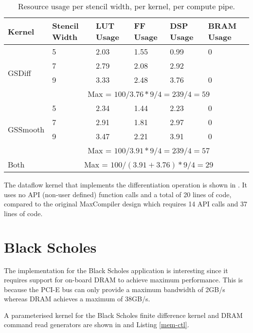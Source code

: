 \begin{table}[ht!]
  \begin{tabularx}{\textwidth}{X|X|X|X|X|X}
    Kernel                    & Stencil Width & LUT Usage & FF Usage & DSP Usage & BRAM Usage   \\
    \hline\hline
    \multirow{4}{*}{GSDiff}   & 5             & 2.03      & 1.55     & 0.99      & 0            \\
    & 7             & 2.79      & 2.08     & 2.92      &              \\
    & 9             & 3.33      & 2.48     & 3.76      & 0            \\
    \cline{2-6}
    & \multicolumn{5}{c}{Max = $100 / 3.76 * 9 / 4 = 239 / 4 = 59 $} \\
    \hline
    \multirow{4}{*}{GSSmooth} & 5             & 2.34      & 1.44     & 2.23      & 0            \\
    & 7             & 2.91      & 1.81     & 2.97      & 0            \\
    & 9             & 3.47      & 2.21     & 3.91      & 0            \\
    \cline{2-6}
    & \multicolumn{5}{c}{Max = $100 / 3.91 * 9 / 4 = 239 / 4 = 57 $} \\
    \hline
    Both                       & \multicolumn{5}{c}{Max = $100 / (3.91 + 3.76) * 9 / 4 = 29 $}  \\
  \end{tabularx}
  \caption{Resource usage per stencil width, per kernel, per compute pipe.}
  \label{table:nd2}
\end{table}


The \FAST{} dataflow kernel that implements the differentiation
operation is shown in . It uses no API (non-user
defined) function calls and a total of 20 lines of code, compared to
the original MaxCompiler design which requires 14 API calls and 37
lines of code.

 \section{Black Scholes}

 The implementation for the Black Scholes application is interesting
 since it requires support for on-board DRAM to achieve maximum
 performance. This is because the PCI-E bus can only provide a maximum
 bandwidth of 2GB/s whereas DRAM achieves a maximum of 38GB/s.

 A parameterised \FAST{} kernel for the Black Scholes finite
 difference kernel and DRAM command read generators are shown in
  and Listing \ref{mem-ctl}.

